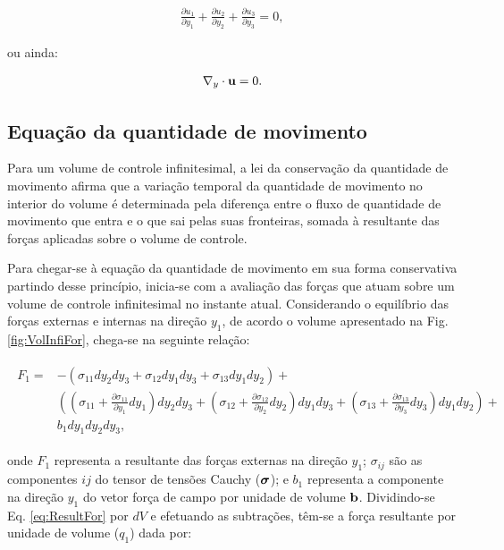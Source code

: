 \documentclass[tese_patricia]{subfiles}%
\begin{document}
\begin{align}
	 \frac{\partial u_{1}}{\partial y_1} + \frac{\partial u_{2}}{\partial y_2} + \frac{\partial u_{3}}{\partial y_3} = 0, 
\end{align} 

\noindent ou ainda:

\begin{align}
	\nabla_y \cdot \mathbf{u} = 0.
	\label{eq:conserMassaIncom} 
\end{align} 

\subsection{Equação da quantidade de movimento}


Para um volume de controle infinitesimal, a lei da conservação da quantidade de movimento afirma que a variação temporal da quantidade de movimento no interior do volume é determinada pela diferença entre o fluxo de quantidade de movimento que entra e o que sai pelas suas fronteiras, somada à resultante das forças aplicadas sobre o volume de controle.

Para chegar-se à equação da quantidade de movimento em sua forma conservativa partindo desse princípio, inicia-se com a avaliação das forças que atuam sobre um volume de controle infinitesimal no instante atual. Considerando o equilíbrio das forças externas e internas na direção $y_1$, de acordo o volume apresentado na Fig. \ref{fig:VolInfiFor}, chega-se na seguinte relação:


\begin{align}
	\begin{split}
	F_1 =& -\left(\sigma_{11}dy_2dy_3 + \sigma_{12}dy_1dy_3 + \sigma_{13}dy_1dy_2\right) + \\ & \left(\left(\sigma_{11} + \frac{\partial \sigma_{11}}{\partial y_1}dy_1 \right)dy_2dy_3 + \left(\sigma_{12}+ \frac{\partial \sigma_{12}}{\partial y_2}dy_2\right)dy_1dy_3 + \left(\sigma_{13}+ \frac{\partial \sigma_{13}}{\partial y_3}dy_3\right)dy_1dy_2\right) + \\& b_{1}dy_1dy_2dy_3, \label{eq:ResultFor} 
	\end{split}
\end{align}	

\noindent onde $F_1$ representa a resultante das forças externas na direção $y_1$; $\sigma_{ij}$ são as componentes $ij$ do tensor de tensões Cauchy ($\bm{\sigma}$); e $b_1$ representa a componente na direção $y_1$ do vetor força de campo por unidade de volume $\mathbf{b}$. Dividindo-se Eq. \ref{eq:ResultFor} por $dV$ e efetuando as subtrações, têm-se a força resultante por unidade de volume ($q_1$) dada por:
\end{document}
